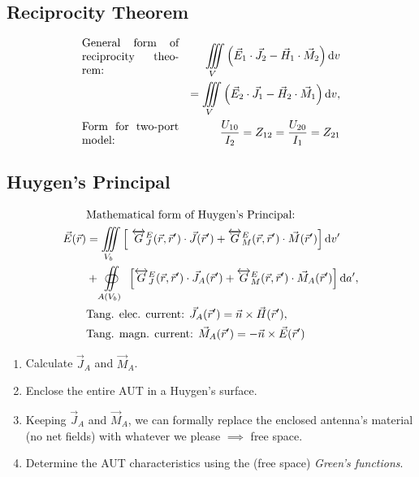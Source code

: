 \subsection{Reciprocity Theorem}
\begin{align*}
    &\text{\parbox{3cm}{General form of reciprocity theorem:}} &\iiint\limits_V\left(\vec{E}_1 \cdot \vec{J}_2 - \vec{H}_1 \cdot \vec{M}_2\right)\mathrm{d}v\\
    & &= \iiint\limits_V\left(\vec{E}_2 \cdot \vec{J}_1 - \vec{H}_2 \cdot \vec{M}_1\right)\mathrm{d}v,\\
    &\text{\parbox{3cm}{Form for two-port model:}} &\dfrac{U_{10}}{I_2} = Z_{12} = \dfrac{U_{20}}{I_1} = Z_{21}
\end{align*}

\subsection{Huygen's Principal}
\begin{align*}
    &\text{Mathematical form of Huygen's Principal:}\\
    \vec{E}(\vec{r})
    &= \iiint\limits_{V_b} \left[\
    \overleftrightarrow{G}^E_J(\vec{r},\vec{r}^\prime)\cdot\vec{J}(\vec{r}^\prime)
    + \overleftrightarrow{G}^E_M(\vec{r},\vec{r}^\prime)\cdot\vec{M}(\vec{r}^\prime) \right] \mathrm{d}v^\prime\\
    &+ \oiint\limits_{A(V_b)}\
    \left[ \overleftrightarrow{G}^E_J(\vec{r},\vec{r}^\prime)\cdot\vec{J}_A(\vec{r}^\prime)
    + \overleftrightarrow{G}^E_M(\vec{r},\vec{r}^\prime)\cdot\vec{M}_A(\vec{r}^\prime) \right] \mathrm{d}a^\prime,\\
    &\text{Tang. elec. current: }\vec{J}_A(\vec{r}^\prime) = \vec{n} \times \vec{H}(\vec{r}^\prime),\\
    &\text{Tang. magn. current: }\vec{M}_A(\vec{r}^\prime) = -\vec{n} \times \vec{E}(\vec{r}^\prime)
\end{align*}
\begin{enumerate}
    \itemsep-1pt
    \item Calculate $\vec{J}_A$ and $\vec{M}_A$.
    \item Enclose the entire AUT in a Huygen's surface.
    \item Keeping $\vec{J}_A$ and $\vec{M}_A$, we can formally replace the enclosed antenna's material (no net fields) with whatever we please $\implies$ free space.
    \item Determine the AUT characteristics using the (free space) \textit{Green's functions}.
\end{enumerate}


